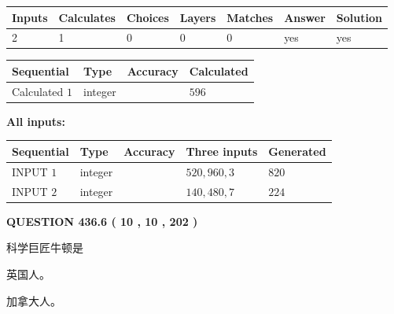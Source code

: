 \documentclass{ctexart}
\begin{document}
 

 
   
   
   
   
\noindent\begin{tabular}{|l|l|l|l|l|l|l|}
 \hline
Inputs & Calculates & Choices & Layers & Matches & Answer & Solution \\ \hline
 2  & 
 1  & 
 0
  & 
 0  & 
 0  & 
  yes & 
  yes 
  \\ \hline
 \end{tabular}
   
   
   
   
\noindent{}
   
   
  
  
\noindent\begin{tabular}{|l|l|l|l|}
\hline
 Sequential & Type & Accuracy & Calculated \\ 
\hline
 
 
  Calculated $  1 $ & integer &  & 
  $ 596 $ 
 \\  \hline  
 \end{tabular}
   
   
   
   
\noindent\vspace{0.1in}\hspace{-0.08in} {\textbf{\Large{All inputs: }}}
   
   
  
  
\noindent\begin{tabular}{|l|l|l|l|l|}
\hline
 Sequential & Type & Accuracy & Three inputs & Generated \\ 
\hline
 
 
  INPUT $  1 $ & integer &  & $
 520
 , 
 960
 , 
 3
 $ & $ 820 $ 
 \\  \hline  
 
 
  INPUT $  2 $ & integer &  & $
 140
 , 
 480
 , 
 7
 $ & $ 224 $ 
 \\  \hline  
 \end{tabular}
   
   
  
\vspace{0.2in}
  
{\textbf{\Large{QUESTION
436.6 
 ( 10 , 10 , 202 )
}}}
  
  
科学巨匠牛顿是
 
 
英国人。
 
 
加拿大人。
 
\end{document}
